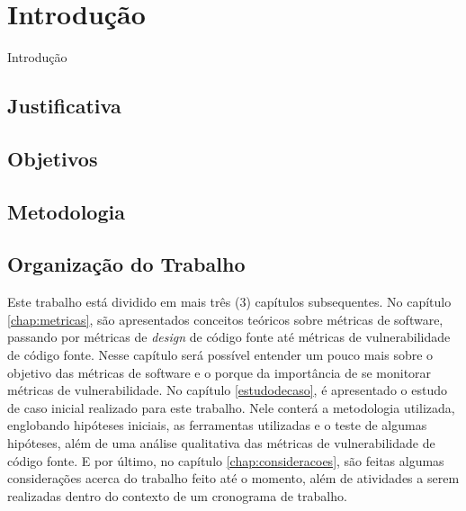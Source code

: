 \chapter{Introdução} \label{cap:introducao}

Introdução

\section{Justificativa}

\section{Objetivos} \label{sec:objetivos}

\section{Metodologia}

\section{Organização do Trabalho}

Este trabalho está dividido em mais três (3) capítulos subsequentes. No capítulo
\ref{chap:metricas}, são apresentados conceitos teóricos sobre métricas de
software, passando por métricas de \textit{design} de código fonte até métricas de 
vulnerabilidade de código fonte. Nesse capítulo será possível entender um pouco mais 
sobre o objetivo das métricas de software e o porque da importância de se monitorar
métricas de vulnerabilidade. No capítulo \ref{estudodecaso}, é apresentado o
estudo de caso inicial realizado para este trabalho. Nele conterá a metodologia
utilizada, englobando hipóteses iniciais, as ferramentas utilizadas e o teste de
algumas hipóteses, além de uma análise qualitativa das métricas de
vulnerabilidade de código fonte. E por último, no capítulo
\ref{chap:consideracoes}, são feitas algumas considerações acerca do trabalho
feito até o momento, além de atividades a serem realizadas dentro do contexto de
um cronograma de trabalho.

